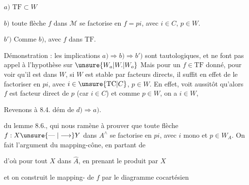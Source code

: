 $a)$  $\mathrm{TF}\subset W$

$b)$ toute flèche $f$ dans $\mathcal{M}$ se factorise en $f=pi$, avec $i\in C$, $p\in W$.

$b')$ Comme $b)$, avec $f$ dans $\mathrm{TF}$.

Démonstration : les implications $a)\Rightarrow b)\Rightarrow b')$
sont tautologiques, et ne font pas appel à l'hypothèse  sur $\unsure{W_a|W.|W_o}$
Mais pour un $f\in\mathrm{TF}$ donné, pour voir qu'il est dans
$W$,  si $W$ est stable par facteurs directs, il suffit en effet de
le factoriser en $pi$, avec $i\in\unsure{\mathrm{TC}|C}$, $p\in W$.
En effet,  voit aussitôt qu'alors
$f$ est facteur direct de $p$ (car $i\in C$) et comme $p\in W$, on a $i\in W$, 

Revenons à 8.4. dém de $d)\Rightarrow a)$.


du lemme 8.6., qui nous ramène à prouver que toute flèche $f:X\unsure{\mathrel{\text{---}}|\longrightarrow}Y$ dans $A^\wedge$ se factorise en $pi$, avec $i$ mono et $p\in W_A$. On fait l'argument du mapping-cône, en partant de


d'où pour tout $X$ dans $\widehat A$, en prenant le produit par $X$


et on construit le mapping- de $f$ par le diagramme cocartésien


